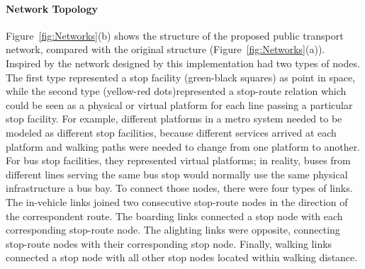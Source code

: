 \paragraph{Network Topology}

Figure~\ref{fig:Networks}(b) shows the structure of the proposed public transport network, compared with the original structure (Figure~\ref{fig:Networks}(a)). Inspired by the network designed by \citet{SpiessFlorian_TransResB_1989} this implementation had two types of nodes. The first type represented a stop facility (green-black squares) as point in space, while the second type (yellow-red dots)represented a stop-route relation which could be seen as a physical or virtual platform for each line  passing a particular stop facility. For example, different platforms in a metro system needed to be modeled as different stop facilities, because different services arrived at each platform and walking paths were needed to change from one platform to another. For bus stop facilities, they represented virtual platforms; in reality, buses from different lines serving the same bus stop would normally use the same physical infrastructure \eg a bus bay. To connect those nodes, there were four types of links. The in-vehicle links joined two consecutive stop-route nodes in the direction of the correspondent route. The boarding links connected a stop node with each corresponding stop-route node. The alighting links were opposite, connecting stop-route nodes with their corresponding stop node. Finally, walking links connected a stop node with all other stop nodes located within walking distance.

